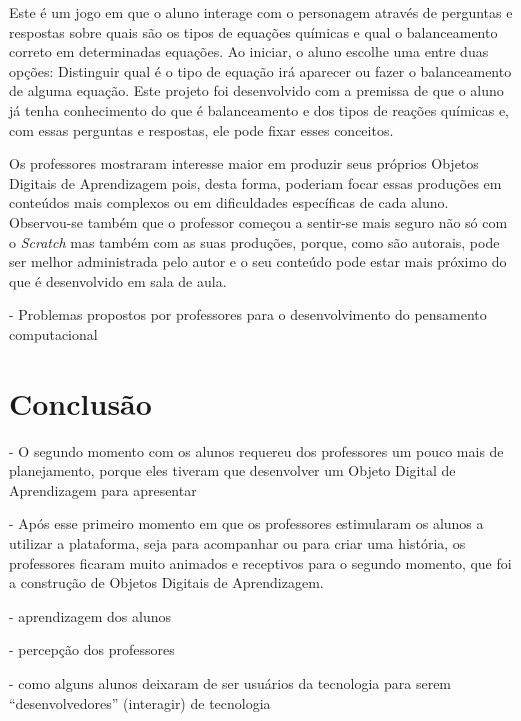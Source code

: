 \documentclass[12pt, openright, a4paper, brazil, english, french, spanish, bibjustif, openany, oneside]{abntex2}
\begin{document}
Este é um jogo em que o aluno interage com o personagem através de perguntas e respostas sobre quais são os tipos de equações químicas e qual o balanceamento correto em determinadas equações. Ao iniciar, o aluno escolhe uma entre duas opções: Distinguir qual é o tipo de equação irá aparecer ou fazer o balanceamento de alguma equação. Este projeto foi desenvolvido com a premissa de que o aluno já tenha conhecimento do que é balanceamento e dos tipos de reações químicas e, com essas perguntas e respostas, ele pode fixar esses conceitos.

Os professores mostraram interesse maior em produzir seus próprios Objetos Digitais de Aprendizagem pois, desta forma, poderiam focar essas produções em conteúdos mais complexos ou em dificuldades específicas de cada aluno. Observou-se também que o professor começou a sentir-se mais seguro não só com o \textit{Scratch} mas também com as suas produções, porque, como são autorais, pode ser melhor administrada pelo autor e o seu conteúdo pode estar mais próximo do que é desenvolvido em sala de aula.

 



- Problemas propostos por professores para o desenvolvimento do pensamento computacional


\chapter*[Conclusão]{Conclusão}

- O segundo momento com os alunos requereu dos professores um pouco mais de planejamento, porque eles tiveram que desenvolver um Objeto Digital de Aprendizagem para apresentar



- Após esse primeiro momento em que os professores estimularam os alunos a utilizar a plataforma, seja para acompanhar ou para criar uma história, os professores ficaram muito animados e receptivos para o segundo momento, que foi a construção de Objetos Digitais de Aprendizagem.

- aprendizagem dos alunos

- percepção dos professores

- como alguns alunos deixaram de ser usuários da tecnologia para serem ``desenvolvedores'' (interagir) de tecnologia


% 
\end{document}
